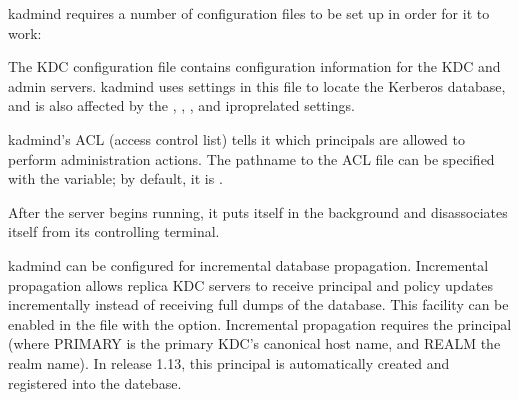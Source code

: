 \documentclass[letterpaper,10pt,english]{sphinxmanual}
\begin{document}
\sphinxAtStartPar
kadmind requires a number of configuration files to be set up in order
for it to work:
\begin{description}
\sphinxAtStartPar
The KDC configuration file contains configuration information for
the KDC and admin servers.  kadmind uses settings in this file to
locate the Kerberos database, and is also affected by the
, , , and iprop\sphinxhyphen{}related
settings.

\sphinxAtStartPar
kadmind’s ACL (access control list) tells it which principals are
allowed to perform administration actions.  The pathname to the
ACL file can be specified with the  {\hyperref[\detokenize{admin/conf_files/kdc_conf:kdc-conf-5}]{}}
variable; by default, it is {\hyperref[\detokenize{mitK5defaults:paths}]{}}.

\end{description}

\sphinxAtStartPar
After the server begins running, it puts itself in the background and
disassociates itself from its controlling terminal.

\sphinxAtStartPar
kadmind can be configured for incremental database propagation.
Incremental propagation allows replica KDC servers to receive
principal and policy updates incrementally instead of receiving full
dumps of the database.  This facility can be enabled in the
{\hyperref[\detokenize{admin/conf_files/kdc_conf:kdc-conf-5}]{}} file with the  option.  Incremental
propagation requires the principal  (where
PRIMARY is the primary KDC’s canonical host name, and REALM the realm
name).  In release 1.13, this principal is automatically created and
registered into the datebase.
\end{document}

